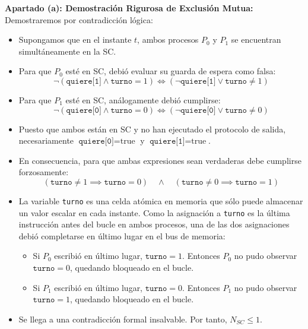 \documentclass[11pt,a4paper,twoside,openright]{report}
\begin{document}
\begin{solucion}
\textbf{Apartado (a): Demostración Rigurosa de Exclusión Mutua:}\\
Demostraremos por contradicción lógica:
\begin{itemize}[leftmargin=*]
    \item Supongamos que en el instante $t$, ambos procesos $P_0$ y $P_1$ se encuentran simultáneamente en la SC.
    \item Para que $P_0$ esté en SC, debió evaluar su guarda de espera como falsa:
    \[
    \neg (\texttt{quiere[1]} \land \texttt{turno} = 1) \iff (\neg \texttt{quiere[1]} \lor \texttt{turno} \ne 1)
    \]
    \item Para que $P_1$ esté en SC, análogamente debió cumplirse:
    \[
    \neg (\texttt{quiere[0]} \land \texttt{turno} = 0) \iff (\neg \texttt{quiere[0]} \lor \texttt{turno} \ne 0)
    \]
    \item Puesto que ambos están en SC y no han ejecutado el protocolo de salida, necesariamente $\texttt{quiere[0]} = \text{true}$ y $\texttt{quiere[1]} = \text{true}$.
    \item En consecuencia, para que ambas expresiones sean verdaderas debe cumplirse forzosamente:
    \[
    (\texttt{turno} \ne 1 \implies \texttt{turno} = 0) \quad \land \quad (\texttt{turno} \ne 0 \implies \texttt{turno} = 1)
    \]
    \item La variable \texttt{turno} es una celda atómica en memoria que sólo puede almacenar un valor escalar en cada instante. Como la asignación a \texttt{turno} es la última instrucción antes del bucle en ambos procesos, una de las dos asignaciones debió completarse en último lugar en el bus de memoria:
    \begin{itemize}[leftmargin=*]
        \item Si $P_0$ escribió en último lugar, $\texttt{turno} = 1$. Entonces $P_0$ no pudo observar $\texttt{turno} = 0$, quedando bloqueado en el bucle.
        \item Si $P_1$ escribió en último lugar, $\texttt{turno} = 0$. Entonces $P_1$ no pudo observar $\texttt{turno} = 1$, quedando bloqueado en el bucle.
    \end{itemize}
    \item Se llega a una contradicción formal insalvable. Por tanto, $N_{SC} \le 1$.
\end{itemize}


\end{solucion}
\end{document}
